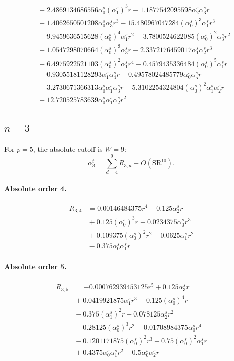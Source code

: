 \documentclass[10pt]{article}
\begin{document}
\begin{align*}
&{}  - 2.4869134686556 \alpha_{0}^s \left(\alpha_{1}^s\right)^{3} r - 1.1877542095598 \alpha_{2}^s \alpha_{3}^s r \\
&{}  - 1.4062650501208 \alpha_{0}^s \alpha_{3}^s r^{3} - 15.480967047284 \left(\alpha_{0}^s\right)^{3} \alpha_{1}^s r^{3} \\
&{}  - 9.9459636515628 \left(\alpha_{0}^s\right)^{4} \alpha_{1}^s r^{2} - 3.7800524622085 \left(\alpha_{0}^s\right)^{2} \alpha_{3}^s r^{2} \\
&{}  - 1.0547298070664 \left(\alpha_{0}^s\right)^{3} \alpha_{3}^s r - 2.3372176459017 \alpha_{1}^s \alpha_{2}^s r^{3} \\
&{}  - 6.4975922521103 \left(\alpha_{0}^s\right)^{2} \alpha_{1}^s r^{4} - 0.4579435336484 \left(\alpha_{0}^s\right)^{5} \alpha_{1}^s r \\
&{}  - 0.93055181128293 \alpha_{1}^s \alpha_{4}^s r - 0.49578024485779 \alpha_{0}^s \alpha_{5}^s r \\
&{}  + 3.2730671366313 \alpha_{0}^s \alpha_{1}^s \alpha_{3}^s r - 5.3102254324804 \left(\alpha_{0}^s\right)^{2} \alpha_{1}^s \alpha_{2}^s r \\
&{}  - 12.720525783639 \alpha_{0}^s \alpha_{1}^s \alpha_{2}^s r^{2}
\end{align*}

\subsection{$n=3$}
For $p=5$, the absolute cutoff is $W=9$:
\[\alpha_{3}^t=\sum_{d=4}^{9}R_{3,d}+O(\mathrm{SR}^{10}).\]
\paragraph{Absolute order 4.}
\begin{align*}
R_{3,4} &= 0.00146484375 r^{4} + 0.125 \alpha_{2}^s r \\
&{}  + 0.125 \left(\alpha_{0}^s\right)^{3} r + 0.0234375 \alpha_{0}^s r^{3} \\
&{}  + 0.109375 \left(\alpha_{0}^s\right)^{2} r^{2} - 0.0625 \alpha_{1}^s r^{2} \\
&{}  - 0.375 \alpha_{0}^s \alpha_{1}^s r
\end{align*}

\paragraph{Absolute order 5.}
\begin{align*}
R_{3,5} &=  - 0.000762939453125 r^{5} + 0.125 \alpha_{3}^s r \\
&{}  + 0.0419921875 \alpha_{1}^s r^{3} - 0.125 \left(\alpha_{0}^s\right)^{4} r \\
&{}  - 0.375 \left(\alpha_{1}^s\right)^{2} r - 0.078125 \alpha_{2}^s r^{2} \\
&{}  - 0.28125 \left(\alpha_{0}^s\right)^{3} r^{2} - 0.01708984375 \alpha_{0}^s r^{4} \\
&{}  - 0.1201171875 \left(\alpha_{0}^s\right)^{2} r^{3} + 0.75 \left(\alpha_{0}^s\right)^{2} \alpha_{1}^s r \\
&{}  + 0.4375 \alpha_{0}^s \alpha_{1}^s r^{2} - 0.5 \alpha_{0}^s \alpha_{2}^s r
\end{align*}
\end{document}
